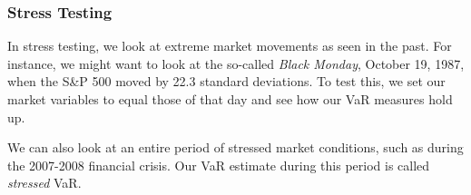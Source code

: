 \documentclass[../Dissertation.tex]{subfiles}
\begin{document}
\subsubsection{Stress Testing}

In stress testing, we look at extreme market movements as seen in the past.
For instance, we might want to look at the so-called \textit{Black Monday}, October 19, 1987, when the S\&P 500 moved by 22.3 standard deviations.
To test this, we set our market variables to equal those of that day and see how our VaR measures hold up.

We can also look at an entire period of stressed market conditions, such as during the 2007-2008 financial crisis.
Our VaR estimate during this period is called \textit{stressed} VaR.
\end{document}
